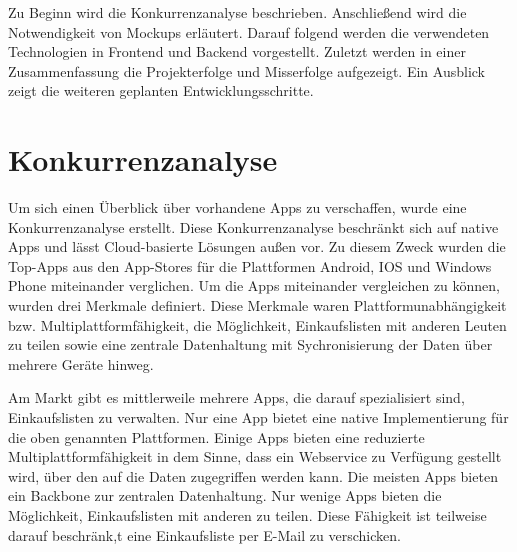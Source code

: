 \documentclass[10pt, conference, compsocconf]{IEEEtran}
\begin{document}
Zu Beginn wird die Konkurrenzanalyse beschrieben. 
Anschließend wird die Notwendigkeit von Mockups erläutert. 
Darauf folgend werden die verwendeten Technologien in Frontend und Backend vorgestellt. 
Zuletzt werden in einer Zusammenfassung die Projekterfolge und Misserfolge aufgezeigt.
Ein Ausblick zeigt die weiteren geplanten Entwicklungsschritte.

\section{Konkurrenzanalyse}
Um sich einen \"Uberblick \"uber vorhandene Apps zu verschaffen, wurde eine Konkurrenzanalyse erstellt.
Diese Konkurrenzanalyse beschr\"ankt sich auf native Apps und l\"asst Cloud-basierte L\"osungen au{\ss}en vor.
Zu diesem Zweck wurden die Top-Apps aus den App-Stores f\"ur die Plattformen Android, IOS und Windows Phone miteinander verglichen.
Um die Apps miteinander vergleichen zu k\"onnen, wurden drei Merkmale definiert. 
Diese Merkmale waren Plattformunabh\"angigkeit bzw. Multiplattformf\"ahigkeit, 
die M\"oglichkeit, Einkaufslisten mit anderen Leuten zu teilen sowie eine zentrale Datenhaltung mit Sychronisierung der Daten \"uber mehrere Ger\"ate hinweg.

Am Markt gibt es mittlerweile mehrere Apps, die darauf spezialisiert sind, Einkaufslisten zu verwalten.
Nur eine App bietet eine native Implementierung f\"ur die oben genannten Plattformen. Einige Apps bieten eine reduzierte Multiplattformf\"ahigkeit in dem Sinne, dass ein Webservice zu Verf\"ugung gestellt wird, \"uber den auf die Daten zugegriffen werden kann.
Die meisten Apps bieten ein Backbone zur zentralen Datenhaltung.
Nur wenige Apps bieten die M\"oglichkeit, Einkaufslisten mit anderen zu teilen. Diese F\"ahigkeit ist teilweise darauf beschr\"ank,t eine Einkaufsliste per E-Mail zu 
verschicken.
\end{document}
